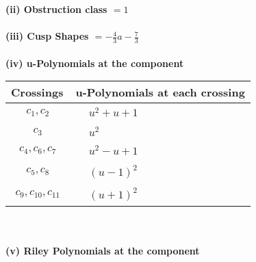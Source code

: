 \documentclass[1p]{elsarticle_modified}
\theoremstyle{definition}
\begin{document}
\flushleft \textbf{(ii) Obstruction class $= 1$}\\~\\
\flushleft \textbf{(iii) Cusp Shapes $= -\frac{4}{3} a-\frac{7}{3}$}\\~\\
\newpage\renewcommand{\arraystretch}{1}
\flushleft \textbf{(iv) u-Polynomials at the component}\newline \\
\begin{tabular}{m{50pt}|m{274pt}}
Crossings & \hspace{64pt}u-Polynomials at each crossing \\
\hline $$\begin{aligned}c_{1},c_{2}\end{aligned}$$&$\begin{aligned}
&u^2+u+1
\end{aligned}$\\
\hline $$\begin{aligned}c_{3}\end{aligned}$$&$\begin{aligned}
&u^2
\end{aligned}$\\
\hline $$\begin{aligned}c_{4},c_{6},c_{7}\end{aligned}$$&$\begin{aligned}
&u^2- u+1
\end{aligned}$\\
\hline $$\begin{aligned}c_{5},c_{8}\end{aligned}$$&$\begin{aligned}
&(u-1)^2
\end{aligned}$\\
\hline $$\begin{aligned}c_{9},c_{10},c_{11}\end{aligned}$$&$\begin{aligned}
&(u+1)^2
\end{aligned}$\\
\hline
\end{tabular}\\~\\
\newpage\renewcommand{\arraystretch}{1}
\flushleft \textbf{(v) Riley Polynomials at the component}\newline \\
\end{document}
